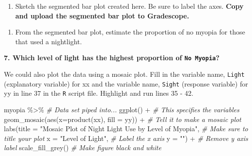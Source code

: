 \documentclass[
]{report}
\newenvironment{Shaded}{\begin{snugshade}}{\end{snugshade}}
\newcommand{\AttributeTok}[1]{\textcolor[rgb]{0.77,0.63,0.00}{#1}}
\newcommand{\CommentTok}[1]{\textcolor[rgb]{0.56,0.35,0.01}{\textit{#1}}}
\newcommand{\FunctionTok}[1]{\textcolor[rgb]{0.00,0.00,0.00}{#1}}
\newcommand{\NormalTok}[1]{#1}
\newcommand{\SpecialCharTok}[1]{\textcolor[rgb]{0.00,0.00,0.00}{#1}}
\newcommand{\StringTok}[1]{\textcolor[rgb]{0.31,0.60,0.02}{#1}}
\providecommand{\tightlist}{%
  \setlength{\itemsep}{0pt}\setlength{\parskip}{0pt}}
\begin{document}
\begin{enumerate}
\def\labelenumi{\arabic{enumi}.}
\setcounter{enumi}{4}
\tightlist
\item
  Sketch the segmented bar plot created here. Be sure to label the axes. \textbf{Copy and upload the segmented bar plot to Gradescope.}
\end{enumerate}

\vspace{2in}

\begin{enumerate}
\def\labelenumi{\arabic{enumi}.}
\setcounter{enumi}{5}
\tightlist
\item
  From the segmented bar plot, estimate the proportion of no myopia for those that used a nightlight.
\end{enumerate}

\vspace{0.5in}

\textbf{7. Which level of light has the highest proportion of \texttt{No\ Myopia}?}

\vspace{0.5in}

We could also plot the data using a mosaic plot. Fill in the variable name, \texttt{Light} (explanatory variable) for xx and the variable name, \texttt{Sight} (response variable) for yy in line 37 in the \texttt{R} script file. Highlight and run lines 35 - 42.

\begin{Shaded}
\begin{Highlighting}[]
\NormalTok{myopia }\SpecialCharTok{\%\textgreater{}\%} \CommentTok{\# Data set piped into...}
  \FunctionTok{ggplot}\NormalTok{() }\SpecialCharTok{+}   \CommentTok{\# This specifies the variables}
  \FunctionTok{geom\_mosaic}\NormalTok{(}\FunctionTok{aes}\NormalTok{(}\AttributeTok{x=}\FunctionTok{product}\NormalTok{(xx), }\AttributeTok{fill =}\NormalTok{ yy)) }\SpecialCharTok{+}  \CommentTok{\# Tell it to make a mosaic plot}
  \FunctionTok{labs}\NormalTok{(}\AttributeTok{title =} \StringTok{"Mosaic Plot of Night Light Use by Level of Myopia"}\NormalTok{,  }
       \CommentTok{\# Make sure to title your plot }
       \AttributeTok{x =} \StringTok{"Level of Light"}\NormalTok{,   }\CommentTok{\# Label the x axis}
       \AttributeTok{y =} \StringTok{""}\NormalTok{) }\SpecialCharTok{+}  \CommentTok{\# Remove y axis label}
      \FunctionTok{scale\_fill\_grey}\NormalTok{()  }\CommentTok{\# Make figure black and white}
\end{Highlighting}
\end{Shaded}
\end{document}
